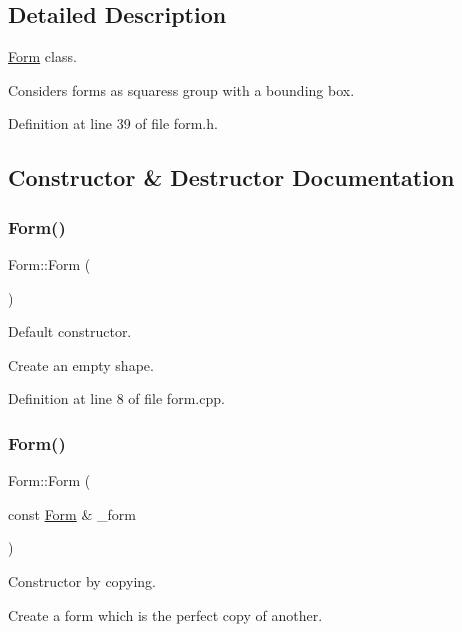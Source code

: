 \subsection{Detailed Description}
\hyperlink{class_form}{Form} class. 

Considers forms as squares\textquotesingle{}s group with a bounding box. 

Definition at line 39 of file form.\+h.



\subsection{Constructor \& Destructor Documentation}
\hypertarget{class_form_a74d41f789dbfcfd081b241e2c44e576a}{}\label{class_form_a74d41f789dbfcfd081b241e2c44e576a} 
\subsubsection{\texorpdfstring{Form()}{Form()}\hspace{0.1cm}{\footnotesize\ttfamily [1/2]}}
{\footnotesize\ttfamily Form\+::\+Form (\begin{DoxyParamCaption}{ }\end{DoxyParamCaption})}



Default constructor. 

Create an empty shape. 

Definition at line 8 of file form.\+cpp.

\hypertarget{class_form_a56a2abc465c4fea2f76d760209d845f1}{}\label{class_form_a56a2abc465c4fea2f76d760209d845f1} 
\subsubsection{\texorpdfstring{Form()}{Form()}\hspace{0.1cm}{\footnotesize\ttfamily [2/2]}}
{\footnotesize\ttfamily Form\+::\+Form (\begin{DoxyParamCaption}\item[{const \hyperlink{class_form}{Form} \&}]{\+\_\+form }\end{DoxyParamCaption})}



Constructor by copying. 

Create a form which is the perfect copy of another.


